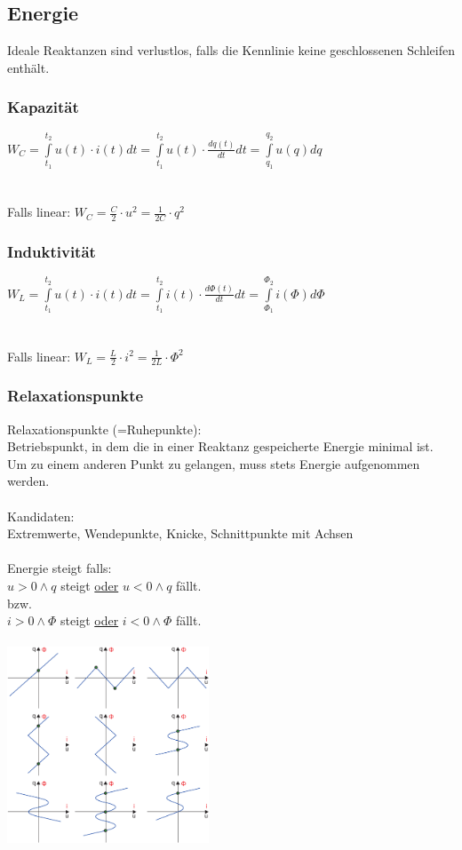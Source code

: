 \documentclass[a4paper,twocolumn,10pt]{article}
\begin{document}
\subsection*{Energie}
Ideale Reaktanzen sind verlustlos, falls die Kennlinie keine geschlossenen Schleifen enthält.

\subsubsection*{Kapazität}
$W_C=\int\limits_{t_1}^{t_2}u(t)\cdot i(t)dt= \int\limits_{t_1}^{t_2}u(t)\cdot \frac{dq(t)}{dt}dt = \int\limits_{q_1}^{q_2}u(q)dq$\\\\\\
Falls linear: $W_C=\frac{C}{2}\cdot u^2=\frac{1}{2C}\cdot q^2$

\subsubsection*{Induktivität}
$W_L=\int\limits_{t_1}^{t_2}u(t)\cdot i(t)dt= \int\limits_{t_1}^{t_2}i(t)\cdot \frac{d\Phi(t)}{dt}dt = \int\limits_{\Phi_1}^{\Phi_2}i(\Phi)d\Phi$\\\\\\
Falls linear: $W_L=\frac{L}{2}\cdot i^2=\frac{1}{2L}\cdot \Phi^2$

\subsubsection*{Relaxationspunkte}
Relaxationspunkte (=Ruhepunkte):\\
Betriebspunkt, in dem die in einer Reaktanz gespeicherte Energie minimal ist.\\
Um zu einem anderen Punkt zu gelangen, muss stets Energie aufgenommen werden.\\\\
Kandidaten:\\
Extremwerte, Wendepunkte, Knicke, Schnittpunkte mit Achsen\\\\
Energie steigt falls:\\
$u>0 \land q$ steigt \underline{oder} $u<0 \land q$ fällt.\\
bzw.\\
$i>0 \land \Phi$ steigt \underline{oder} $i<0 \land \Phi$ fällt.\\\\
\includegraphics[width=0.45\textwidth]{img/Relaxationspunkte}
\end{document}

